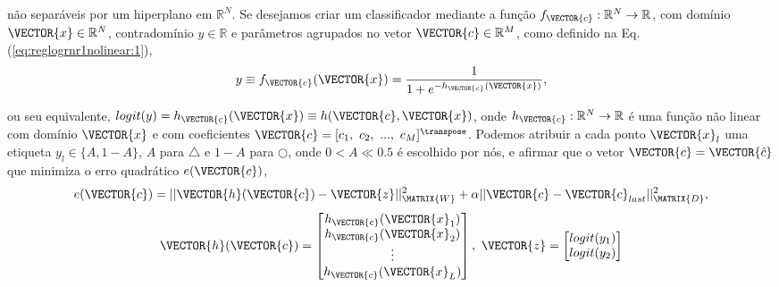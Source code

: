 \begin{theorem}
\begin{minipage}{0.55\textwidth}
não separáveis por um hiperplano  em $\mathbb{R}^{N}$.
Se desejamos criar um classificador mediante 
a função  $f_{\VECTOR{c}}:\mathbb{R}^{N} \rightarrow \mathbb{R}$,
com domínio $\VECTOR{x} \in \mathbb{R}^{N}$, contradomínio $y \in \mathbb{R}$ e 
parâmetros agrupados no vetor $\VECTOR{c} \in \mathbb{R}^{M}$,
como definido na Eq. (\ref{eq:reglogrnr1nolinear:1}),
\begin{equation}\label{eq:reglogrnr1nolinear:1}
y\equiv f_{\VECTOR{c}}(\VECTOR{x})= \frac{1}{1+e^{-h_{\VECTOR{c}}(\VECTOR{x})}},
\end{equation}
\end{minipage}
ou seu equivalente, $logit(y)=h_{\VECTOR{c}}(\VECTOR{x})\equiv h(\VECTOR{c},\VECTOR{x})$,
onde $h_{\VECTOR{c}}: \mathbb{R}^{N} \rightarrow \mathbb{R}$ é uma função não linear
com domínio $\VECTOR{x}$ e
com coeficientes $\VECTOR{c}=[c_1,~c_2,~...,~c_M]^{\transpose}$.
Podemos atribuir a cada ponto $\VECTOR{x}_l$ uma etiqueta $y_l\in \{A,1-A\}$, 
$A$ para $\bigtriangleup$ e  $1-A$ para $\bigcirc$,
onde $0<A\ll 0.5$ é escolhido por nós,
e afirmar que o vetor $\VECTOR{c}= \VECTOR{\hat{c}}$
que minimiza o erro quadrático $e(\VECTOR{c})$,
\begin{equation}\label{eq:reglogrnr1nolinear:1e}
e(\VECTOR{c}) =  ||\VECTOR{h}(\VECTOR{c})-\VECTOR{z}||_{\MATRIX{W}}^2 + \alpha||\VECTOR{c}-\VECTOR{c}_{last}||_{\MATRIX{D}}^2,
\end{equation}
\begin{equation}
\VECTOR{h}(\VECTOR{c})=\begin{bmatrix}
h_{\VECTOR{c}}(\VECTOR{x}_1)\\ 
h_{\VECTOR{c}}(\VECTOR{x}_2)\\ 
\vdots\\ 
h_{\VECTOR{c}}(\VECTOR{x}_L)
\end{bmatrix},
~
\VECTOR{z}=
\begin{bmatrix}
logit(y_1)  \\
logit(y_2)  \\

\end{bmatrix}
\end{equation}
\end{theorem}
